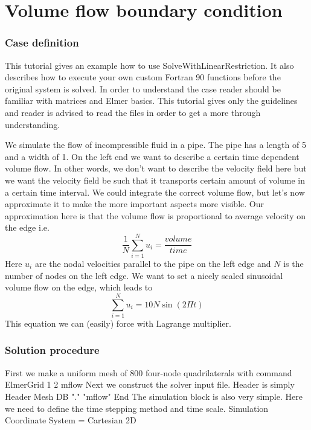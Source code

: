 \chapter{Volume flow boundary condition}


\subsection*{Case definition}

This tutorial gives an example how to use SolveWithLinearRestriction. It also describes
how to execute your own custom Fortran 90 functions before the original system is solved. In order to
understand the case reader should be familiar with  matrices and
Elmer basics. This tutorial gives only the guidelines and reader is advised to
read the files in order to get a more through understanding.

We simulate the flow of incompressible fluid in a pipe.
The pipe has a length of 5 and a width of 1. On the left end we want to describe
a certain time dependent volume flow. In other words, we don't want to describe the velocity field
here but we want the velocity field be such that it transports certain amount of volume
in a certain time interval. We could integrate the correct volume flow, but let's now approximate it
to make the more important aspects more visible. Our approximation here is that the volume
flow is proportional to average velocity on the edge i.e.
\begin{equation}
\frac{1}{N}\sum_{i=1}^{N}u_i = \frac{volume}{time}
\end{equation}
Here $u_i$ are the nodal velocities parallel to the pipe on the left edge and $N$ is the number of nodes on
the left edge. We want to set a nicely scaled sinusoidal volume flow on the edge, which leads to
\begin{equation}
\sum_{i=1}^{N}u_i = 10N\sin(2\Pi t)
\end{equation}
This equation we can (easily) force with Lagrange multiplier.

\subsection*{Solution procedure}
First we make a uniform mesh of 800 four-node quadrilaterals with command
\ttbegin
ElmerGrid 1 2 mflow
\ttend
Next we construct the solver input file. Header is simply
\ttbegin
Header
  Mesh DB "." "mflow"
End
\ttend
The simulation block is also very simple. 
Here we need to define the time stepping method and time scale.
\ttbegin
Simulation
  Coordinate System = Cartesian 2D

